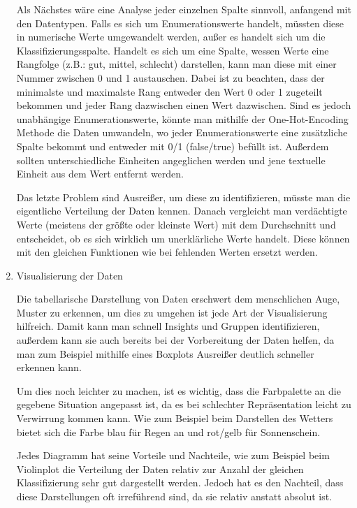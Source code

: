 \begin{enumerate}
            Als Nächstes wäre eine Analyse jeder einzelnen Spalte sinnvoll, anfangend mit den Datentypen. Falls es sich um Enumerationswerte handelt, müssten diese in numerische Werte umgewandelt werden, außer es handelt sich um die Klassifizierungsspalte. Handelt es sich um eine Spalte, wessen Werte eine Rangfolge (z.B.: gut, mittel, schlecht) darstellen, kann man diese mit einer Nummer zwischen 0 und 1 austauschen. Dabei ist zu beachten, dass der minimalste und maximalste Rang entweder den Wert 0 oder 1 zugeteilt bekommen und jeder Rang dazwischen einen Wert dazwischen. Sind es jedoch unabhängige Enumerationswerte, könnte man mithilfe der One-Hot-Encoding Methode die Daten umwandeln, wo jeder Enumerationswerte eine zusätzliche Spalte bekommt und entweder mit 0/1 (false/true) befüllt ist. Außerdem sollten unterschiedliche Einheiten angeglichen werden und jene textuelle Einheit aus dem Wert entfernt werden.

            Das letzte Problem sind Ausreißer, um diese zu identifizieren, müsste man die eigentliche Verteilung der Daten kennen. Danach vergleicht man verdächtigte Werte (meistens der größte oder kleinste Wert) mit dem Durchschnitt und entscheidet, ob es sich wirklich um unerklärliche Werte handelt. Diese können mit den gleichen Funktionen wie bei fehlenden Werten ersetzt werden.

      \item Visualisierung der Daten

            Die tabellarische Darstellung von Daten erschwert dem menschlichen Auge, Muster zu erkennen, um dies zu umgehen ist jede Art der Visualisierung hilfreich. Damit kann man schnell Insights und Gruppen identifizieren, außerdem kann sie auch bereits bei der Vorbereitung der Daten helfen, da man zum Beispiel mithilfe eines Boxplots Ausreißer deutlich schneller erkennen kann.

            Um dies noch leichter zu machen, ist es wichtig, dass die Farbpalette an die gegebene Situation angepasst ist, da es bei schlechter Repräsentation leicht zu Verwirrung kommen kann. Wie zum Beispiel beim Darstellen des Wetters bietet sich die Farbe blau für Regen an und rot/gelb für Sonnenschein.

            Jedes Diagramm hat seine Vorteile und Nachteile, wie zum Beispiel beim Violinplot die Verteilung der Daten relativ zur Anzahl der gleichen Klassifizierung sehr gut dargestellt werden. Jedoch hat es den Nachteil, dass diese Darstellungen oft irreführend sind, da sie relativ anstatt absolut ist.


\end{enumerate}
